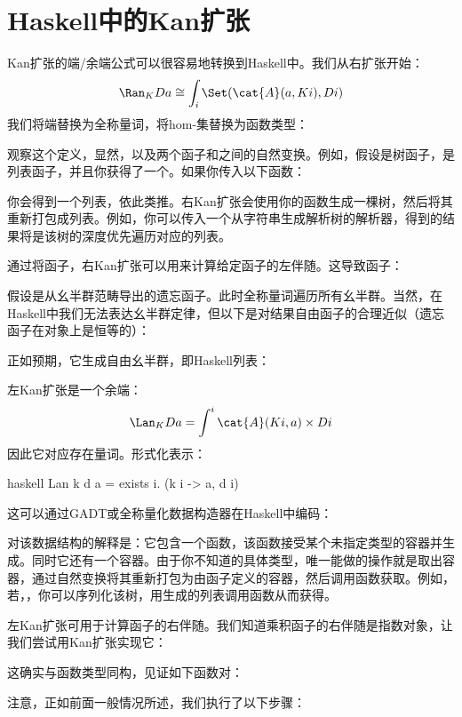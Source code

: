 \section{Haskell中的Kan扩张}

Kan扩张的端/余端公式可以很容易地转换到Haskell中。我们从右扩张开始：
$$\Ran_{K}D a \cong \int_i \Set(\cat{A}(a, K i), D i)$$
我们将端替换为全称量词，将hom-集替换为函数类型：

观察这个定义，显然，以及两个函子和之间的自然变换。例如，假设是树函子，是列表函子，并且你获得了一个。如果你传入以下函数：

你会得到一个列表，依此类推。右Kan扩张会使用你的函数生成一棵树，然后将其重新打包成列表。例如，你可以传入一个从字符串生成解析树的解析器，得到的结果将是该树的深度优先遍历对应的列表。

通过将函子，右Kan扩张可以用来计算给定函子的左伴随。这导致函子：

假设是从幺半群范畴导出的遗忘函子。此时全称量词遍历所有幺半群。当然，在Haskell中我们无法表达幺半群定律，但以下是对结果自由函子的合理近似（遗忘函子在对象上是恒等的）：

正如预期，它生成自由幺半群，即Haskell列表：

左Kan扩张是一个余端：
$$\Lan_{K}D a = \int^i \cat{A}(K i, a)\times{}D i$$
因此它对应存在量词。形式化表示：

\begin{snip}{haskell}
Lan k d a = exists i. (k i -> a, d i)
\end{snip}
这可以通过GADT或全称量化数据构造器在Haskell中编码：

对该数据结构的解释是：它包含一个函数，该函数接受某个未指定类型的容器并生成。同时它还有一个容器。由于你不知道的具体类型，唯一能做的操作就是取出容器，通过自然变换将其重新打包为由函子定义的容器，然后调用函数获取。例如，若，，你可以序列化该树，用生成的列表调用函数从而获得。

左Kan扩张可用于计算函子的右伴随。我们知道乘积函子的右伴随是指数对象，让我们尝试用Kan扩张实现它：

这确实与函数类型同构，见证如下函数对：

注意，正如前面一般情况所述，我们执行了以下步骤：

